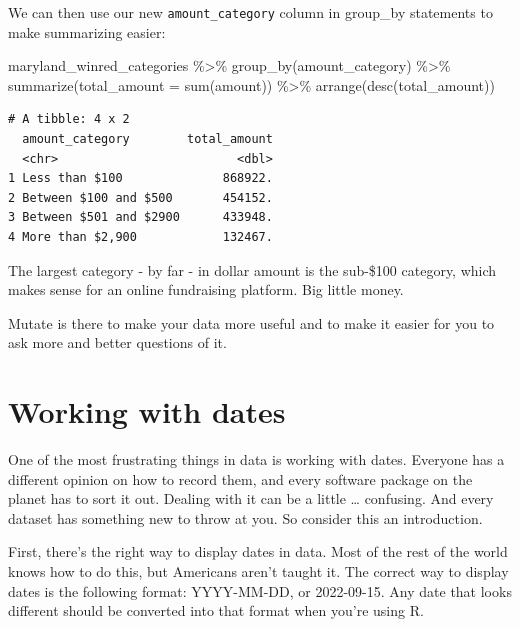 \documentclass[
  letterpaper,
  DIV=11,
  numbers=noendperiod]{scrreprt}
\newenvironment{Shaded}{\begin{snugshade}}{\end{snugshade}}
\newcommand{\AttributeTok}[1]{\textcolor[rgb]{0.40,0.45,0.13}{#1}}
\newcommand{\FunctionTok}[1]{\textcolor[rgb]{0.28,0.35,0.67}{#1}}
\newcommand{\NormalTok}[1]{\textcolor[rgb]{0.00,0.23,0.31}{#1}}
\newcommand{\SpecialCharTok}[1]{\textcolor[rgb]{0.37,0.37,0.37}{#1}}
\begin{document}
We can then use our new \texttt{amount\_category} column in group\_by
statements to make summarizing easier:

\begin{Shaded}
\begin{Highlighting}[]
\NormalTok{maryland\_winred\_categories }\SpecialCharTok{\%\textgreater{}\%}
  \FunctionTok{group\_by}\NormalTok{(amount\_category) }\SpecialCharTok{\%\textgreater{}\%}
  \FunctionTok{summarize}\NormalTok{(}\AttributeTok{total\_amount =} \FunctionTok{sum}\NormalTok{(amount)) }\SpecialCharTok{\%\textgreater{}\%}
  \FunctionTok{arrange}\NormalTok{(}\FunctionTok{desc}\NormalTok{(total\_amount))}
\end{Highlighting}
\end{Shaded}

\begin{verbatim}
# A tibble: 4 x 2
  amount_category        total_amount
  <chr>                         <dbl>
1 Less than $100              868922.
2 Between $100 and $500       454152.
3 Between $501 and $2900      433948.
4 More than $2,900            132467.
\end{verbatim}

The largest category - by far - in dollar amount is the sub-\$100
category, which makes sense for an online fundraising platform. Big
little money.

Mutate is there to make your data more useful and to make it easier for
you to ask more and better questions of it.


\hypertarget{working-with-dates}{%
\chapter{Working with dates}\label{working-with-dates}}

One of the most frustrating things in data is working with dates.
Everyone has a different opinion on how to record them, and every
software package on the planet has to sort it out. Dealing with it can
be a little \ldots{} confusing. And every dataset has something new to
throw at you. So consider this an introduction.

First, there's the right way to display dates in data. Most of the rest
of the world knows how to do this, but Americans aren't taught it. The
correct way to display dates is the following format: YYYY-MM-DD, or
2022-09-15. Any date that looks different should be converted into that
format when you're using R.
\end{document}
